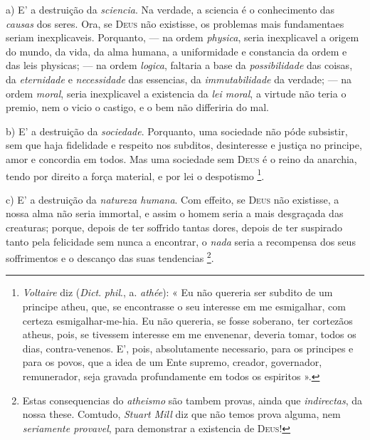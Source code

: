  a) E' a destruição da \emph{sciencia}. Na verdade, a sciencia é o conhecimento das \emph{causas} dos seres. Ora, se \textsc{Deus} não existisse, os problemas mais fundamentaes seriam inexplicaveis. Porquanto, --- na ordem \emph{physica}, seria inexplicavel a origem do mundo, da vida, da alma humana, a uniformidade e constancia da ordem e das leis physicas; --- na ordem \emph{logica}, faltaria a base da \emph{possibilidade} das coisas, da \emph{eternidade} e \emph{necessidade} das essencias, da \emph{immutabilidade} da verdade; --- na ordem \emph{moral}, seria inexplicavel a existencia da \emph{lei moral}, a virtude não teria o premio, nem o vicio o castigo, e o bem não differiria do mal.

b) E' a destruição da \emph{sociedade}. Porquanto, uma sociedade não póde subsistir, sem que haja fidelidade e respeito nos subditos, desinteresse e justiça no principe, amor e concordia em todos. Mas uma sociedade sem \textsc{Deus} é o reino da anarchia, tendo por direito a força material, e por lei o despotismo \footnote{\emph{Voltaire} diz (\emph{Dict}. \emph{phil}., a. \emph{athée}): « Eu não quereria ser subdito de um principe atheu, que, se encontrasse o seu interesse em me esmigalhar, com certeza esmigalhar-me-hia. Eu não quereria, se fosse soberano, ter cortezãos atheus, pois, se tivessem interesse em me envenenar, deveria tomar, todos os dias, contra-venenos. E', pois, absolutamente necessario, para os principes e para os povos, que a idea de um Ente supremo, creador, governador, remunerador, seja gravada profundamente em todos os espiritos ».}.

c) E' a destruição da \emph{natureza humana}. Com effeito, se \textsc{Deus} não existisse, a nossa alma não seria immortal, e assim o homem seria a mais desgraçada das creaturas; porque, depois de ter soffrido tantas dores, depois de ter suspirado tanto pela felicidade sem nunca a encontrar, o \emph{nada} seria a recompensa dos seus soffrimentos e o descanço das suas tendencias \footnote{Estas consequencias do \emph{atheismo} são tambem provas, ainda que \emph{indirectas}, da nossa these. Comtudo, \emph{Stuart Mill} diz que não temos prova alguma, nem \emph{seriamente provavel}, para demonstrar a existencia de \textsc{Deus}!}.
